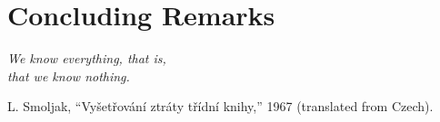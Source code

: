 \chapter{Concluding Remarks}
\label{part:conclusions}

\setlength{\epigraphwidth}{0.46\textwidth}
\epigraph{ \it
    We know everything, that is, \\
    that we know nothing.
}{
    L. Smoljak, ``Vyšetřování ztráty třídní knihy,'' 1967 (translated from Czech).
}